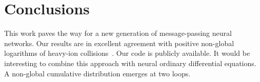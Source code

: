 \section{Conclusions}\label{sec:conclusions}

This work paves the way for a new generation of message-passing neural
networks. Our results are in excellent agreement with positive
non-global logarithms of heavy-ion
collisions~\cite{TPC:2122-Are-Quark-and-Gluon-Jets-Power-Suppressed-October-6-2026}.
Our code is publicly available. It would be interesting to combine this
approach with neural ordinary differential equations. A non-global
cumulative distribution emerges at two loops.

